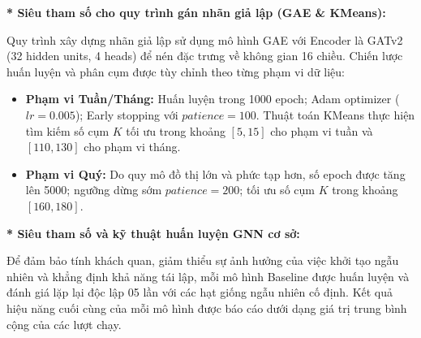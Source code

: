 \textbf{* Siêu tham số cho quy trình gán nhãn giả lập (GAE \& KMeans):}\vspace{0.2cm}

Quy trình xây dựng nhãn giả lập sử dụng mô hình GAE với Encoder là GATv2 (32 hidden units, 4 heads) để nén đặc trưng về không gian 16 chiều. Chiến lược huấn luyện và phân cụm được tùy chỉnh theo từng phạm vi dữ liệu:
\begin{itemize}[label={--}, itemsep=1pt]
    \item \textbf{Phạm vi Tuần/Tháng:} Huấn luyện trong 1000 epoch; Adam optimizer ($lr=0.005$); Early stopping với $patience=100$. Thuật toán KMeans thực hiện tìm kiếm số cụm $K$ tối ưu trong khoảng $[5, 15]$ cho phạm vi tuần và $[110, 130]$ cho phạm vi tháng.
    \item \textbf{Phạm vi Quý:} Do quy mô đồ thị lớn và phức tạp hơn, số epoch được tăng lên 5000; ngưỡng dừng sớm $patience=200$; tối ưu số cụm $K$ trong khoảng $[160, 180]$.
\end{itemize}

\textbf{* Siêu tham số và kỹ thuật huấn luyện GNN cơ sở:}\vspace{0.2cm}

Để đảm bảo tính khách quan, giảm thiểu sự ảnh hưởng của việc khởi tạo ngẫu nhiên và khẳng định khả năng tái lập, mỗi mô hình Baseline được huấn luyện và đánh giá lặp lại độc lập 05 lần với các hạt giống ngẫu nhiên cố định. Kết quả hiệu năng cuối cùng của mỗi mô hình được báo cáo dưới dạng giá trị trung bình cộng của các lượt chạy.\vspace{0.2cm}

